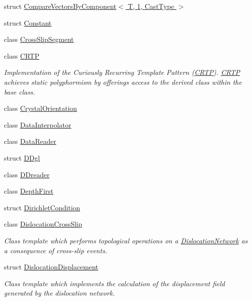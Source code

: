 \begin{DoxyCompactItemize}
\item 
struct \hyperlink{structmodel_1_1_compare_vectors_by_component_3_01_t_00_011_00_01_cast_type_01_4}{Compare\+Vectors\+By\+Component$<$ T, 1, Cast\+Type $>$}
\item 
struct \hyperlink{structmodel_1_1_constant}{Constant}
\item 
class \hyperlink{classmodel_1_1_cross_slip_segment}{Cross\+Slip\+Segment}
\item 
class \hyperlink{classmodel_1_1_c_r_t_p}{C\+R\+T\+P}
\begin{DoxyCompactList}\small\item\em Implementation of the Curiously Recurring Template Pattern (\hyperlink{classmodel_1_1_c_r_t_p}{C\+R\+T\+P}). \hyperlink{classmodel_1_1_c_r_t_p}{C\+R\+T\+P} achieves static polyphormism by offerings access to the derived class within the base class. \end{DoxyCompactList}\item 
class \hyperlink{classmodel_1_1_crystal_orientation}{Crystal\+Orientation}
\item 
class \hyperlink{classmodel_1_1_data_interpolator}{Data\+Interpolator}
\item 
class \hyperlink{classmodel_1_1_data_reader}{Data\+Reader}
\item 
struct \hyperlink{structmodel_1_1_d_dgl}{D\+Dgl}
\item 
class \hyperlink{classmodel_1_1_d_dreader}{D\+Dreader}
\item 
class \hyperlink{classmodel_1_1_depth_first}{Depth\+First}
\item 
struct \hyperlink{structmodel_1_1_dirichlet_condition}{Dirichlet\+Condition}
\item 
class \hyperlink{classmodel_1_1_dislocation_cross_slip}{Dislocation\+Cross\+Slip}
\begin{DoxyCompactList}\small\item\em Class template which performs topological operations on a \hyperlink{classmodel_1_1_dislocation_network}{Dislocation\+Network} as a consequence of cross-\/slip events. \end{DoxyCompactList}\item 
struct \hyperlink{structmodel_1_1_dislocation_displacement}{Dislocation\+Displacement}
\begin{DoxyCompactList}\small\item\em Class template which implements the calculation of the displacement field generated by the dislocation network. \end{DoxyCompactList}\item 

\end{DoxyCompactItemize}
